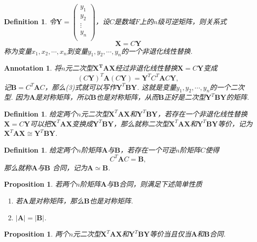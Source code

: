 \documentclass{article}
\newtheorem{proposition}[theorem]{Proposition}
\newtheorem{definition}[theorem]{Definition}
\newtheorem{annotation}[theorem]{Annotation}
\newcommand{\mbf}[1]{\bm{#1}}
\begin{document}
\begin{definition}
\rm 令$\mbf{Y}=\begin{pmatrix}
y_1 \\
y_2 \\
\vdots \\
y_n \\
\end{pmatrix}$，设$C$是数域$F$上的$n$级可逆矩阵，则关系式
$$
\mbf{X} = C\mbf{Y}
$$
称为变量$x_1,x_2,\cdots,x_n$到变量$y_1,y_2,\cdots,y_n$的一个{\color{red}非退化线性替换}. 
\end{definition}

\begin{annotation}
\rm 将$n$元二次型$\mbf{X^T}\mbf{A}\mbf{X}$经过非退化线性替换$\mbf{X} = C\mbf{Y}$变成
\begin{equation}
(C\mbf{Y})^T\mbf{A}(C\mbf{Y}) = \mbf{Y}^TC^T\mbf{A}C\mbf{Y},
\end{equation}
记$\mbf{B}=C^T\mbf{A}C$，那么(3)式就可以写作$\mbf{Y}^T\mbf{B}\mbf{Y}$. 这就是变量$y_1,y_2,\cdots,y_n$的一个二次型. 因为$\mbf{A}$是对称矩阵，所以$\mbf{B}$也是对称矩阵，从而$\mbf{B}$正好是二次型$\mbf{Y}^T\mbf{B}\mbf{Y}$的矩阵.
\end{annotation}

\begin{definition}
\rm 给定两个$n$元二次型$\mbf{X}^T\mbf{A}\mbf{X}$和$\mbf{Y}^T\mbf{B}\mbf{Y}$，若存在一个非退化线性替换$\mbf{X} = C\mbf{Y}$可以把$\mbf{X}^T\mbf{A}\mbf{X}$变换成$\mbf{Y}^T\mbf{B}\mbf{Y}$，那么就称二次型$\mbf{X}^T\mbf{A}\mbf{X}$和$\mbf{Y}^T\mbf{B}\mbf{Y}$等价，记为$\mbf{X}^T\mbf{A}\mbf{X} \cong \mbf{Y}^T\mbf{B}\mbf{Y}$. 
\end{definition}

\begin{definition}
\rm 给定两个$n$阶矩阵$\mbf{A}$与$\mbf{B}$，若存在一个可逆$n$阶矩阵$C$使得
$$
C^T\mbf{A}C = \mbf{B},
$$
那么就称$\mbf{A}$与$\mbf{B}$ {\color{red}合同}，记为$\mbf{A} \simeq \mbf{B}$.
\end{definition}

\begin{proposition}
\rm 若两个$n$阶矩阵$\mbf{A}$与$\mbf{B}$合同，则满足下述简单性质
\begin{enumerate}
	\item 若$\mbf{A}$是对称矩阵，那么$\mbf{B}$也是对称矩阵. 
	\item $|\mbf{A}| = |\mbf{B}|$. 
\end{enumerate}
\end{proposition}


\begin{proposition}
\rm 两个$n$元二次型$\mbf{X}^T\mbf{A}\mbf{X}$和$\mbf{Y}^T\mbf{B}\mbf{Y}$等价当且仅当$\mbf{A}$和$\mbf{B}$合同.
\end{proposition}
\end{document}
